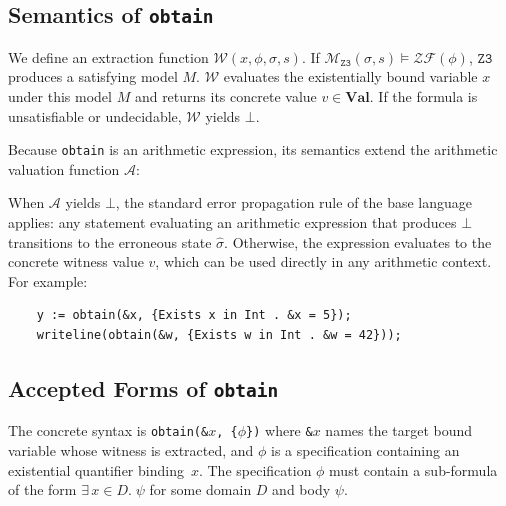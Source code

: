 \documentclass{article}
\begin{document}
\subsection{Semantics of \texttt{obtain}}
We define an extraction function $\mathcal{W}(x, \phi, \sigma, s)$. If $\mathcal{M}_{\mathtt{Z3}}(\sigma, s) \models \mathcal{ZF}(\phi)$, $\mathtt{Z3}$ produces a satisfying model $M$. $\mathcal{W}$ evaluates the existentially bound variable $x$ under this model $M$ and returns its concrete value $v \in \textbf{Val}$. If the formula is unsatisfiable or undecidable, $\mathcal{W}$ yields $\bot$.

Because \texttt{obtain} is an arithmetic expression, its semantics extend the arithmetic valuation function $\mathcal{A}$:

\begin{table}[!ht]
\centering
\renewcommand{\arraystretch}{1.6} 
\large
{}
\caption{Extension of $\mathcal{A}$ for witness extraction}
\end{table}

When $\mathcal{A}$ yields $\bot$, the standard error propagation rule of the base language applies: any statement evaluating an arithmetic expression that produces $\bot$ transitions to the erroneous state $\hat{\sigma}$. Otherwise, the expression evaluates to the concrete witness value $v$, which can be used directly in any arithmetic context. For example:
\begin{verbatim}
    y := obtain(&x, {Exists x in Int . &x = 5});
    writeline(obtain(&w, {Exists w in Int . &w = 42}));
\end{verbatim}

\subsection{Accepted Forms of \texttt{obtain}}

The concrete syntax is \texttt{obtain(\&$x$, \{$\phi$\})} where \texttt{\&$x$} names the target bound variable whose witness is extracted, and $\phi$ is a specification containing an existential quantifier binding~$x$. The specification $\phi$ must contain a sub-formula of the form $\exists\, x \in D.\; \psi$ for some domain $D$ and body $\psi$.
\end{document}
